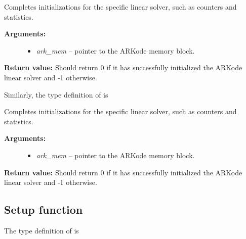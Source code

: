 \documentclass[letterpaper,10pt,english]{sphinxmanual}
\begin{document}
\begin{fulllineitems}
\label{linear_solvers/custom:linit}
Completes initializations for the specific linear solver, such as
counters and statistics.
\begin{description}
\item[{\textbf{Arguments:}}] \leavevmode\begin{itemize}
\item {} 
\emph{ark\_mem} -- pointer to the ARKode memory block.

\end{itemize}

\end{description}

\textbf{Return value:}  Should return 0 if it has successfully
initialized the ARKode linear solver and -1 otherwise.

\end{fulllineitems}


Similarly, the type definition of {\hyperref[linear_solvers/custom:minit]{}} is

\begin{fulllineitems}
\label{linear_solvers/custom:minit}
Completes initializations for the specific linear solver, such as
counters and statistics.
\begin{description}
\item[{\textbf{Arguments:}}] \leavevmode\begin{itemize}
\item {} 
\emph{ark\_mem} -- pointer to the ARKode memory block.

\end{itemize}

\end{description}

\textbf{Return value:}  Should return 0 if it has successfully
initialized the ARKode linear solver and -1 otherwise.

\end{fulllineitems}



\subsection{Setup function}
\label{linear_solvers/custom:setup-function}
The type definition of {\hyperref[linear_solvers/custom:lsetup]{}} is
\end{document}
